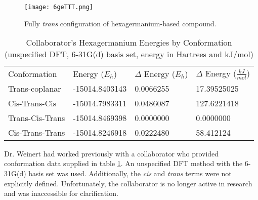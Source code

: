 \begin{figure}
	
	\centering
	
	\texttt{[image: 6geTTT.png]}
	
	\caption{Fully \textit{trans} configuration of hexagermanium-based compound.}
	
	\label{fig:Ge6TransAll}
	
\end{figure}
\begin{table}[]
	
	\centering
	\begin{tabular}{llll}
		Conformation & Energy ($E_{h}$)    & $\Delta$ Energy ($E_{h}$) & $\Delta$ Energy ($\frac{kJ}{mol}$) \\ \cline{1-4} 
		Trans-coplanar        & -15014.8403143 & 0.0066255            & 17.39525025                        \\
		Cis-Trans-Cis         & -15014.7983311 & 0.0486087            & 127.6221418                        \\
		Trans-Cis-Trans       & -15014.8469398 & 0.0000000            & 0.0000000                                  \\
		Cis-Trans-Trans       & -15014.8246918 & 0.0222480            & 58.412124                         
	\end{tabular}
	\caption{Collaborator's Hexagermanium Energies by Conformation \\ (unspecified DFT, 6-31G(d) basis set, energy in Hartrees and kJ/mol)}
	
	\label{tab:Ge6CollabEnergies}
	
\end{table}
Dr. Weinert had worked previously with a collaborator who provided conformation data supplied in table \ref{tab:Ge6CollabEnergies}.
An unspecified DFT method with the 6-31G(d) basis set was used. 
Additionally, the \textit{cis} and \textit{trans} terms were not explicitly defined.
Unfortunately, the collaborator is no longer active in research and was inaccessible for clarification.

